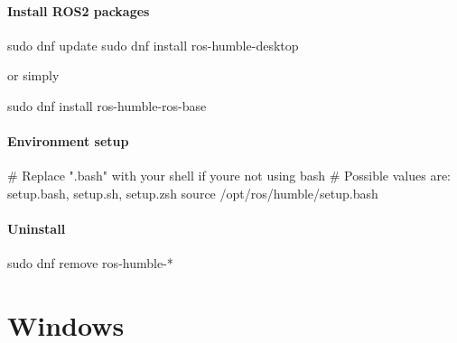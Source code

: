 \documentclass[
  letterpaper,
  DIV=11,
  numbers=noendperiod]{scrreprt}
\newenvironment{Shaded}{\begin{snugshade}}{\end{snugshade}}
\newcommand{\BuiltInTok}[1]{\textcolor[rgb]{0.00,0.23,0.31}{#1}}
\newcommand{\CommentTok}[1]{\textcolor[rgb]{0.37,0.37,0.37}{#1}}
\newcommand{\FunctionTok}[1]{\textcolor[rgb]{0.28,0.35,0.67}{#1}}
\newcommand{\NormalTok}[1]{\textcolor[rgb]{0.00,0.23,0.31}{#1}}
\newcommand{\PreprocessorTok}[1]{\textcolor[rgb]{0.68,0.00,0.00}{#1}}
\begin{document}
\hypertarget{install-ros2-packages-1}{%
\subsubsection{Install ROS2 packages}\label{install-ros2-packages-1}}

\begin{Shaded}
\begin{Highlighting}[]
\FunctionTok{sudo}\NormalTok{ dnf update}
\FunctionTok{sudo}\NormalTok{ dnf install ros{-}humble{-}desktop}
\end{Highlighting}
\end{Shaded}

or simply

\begin{Shaded}
\begin{Highlighting}[]
\FunctionTok{sudo}\NormalTok{ dnf install ros{-}humble{-}ros{-}base}
\end{Highlighting}
\end{Shaded}

\hypertarget{environment-setup-1}{%
\subsubsection{Environment setup}\label{environment-setup-1}}

\begin{Shaded}
\begin{Highlighting}[]
\CommentTok{\# Replace ".bash" with your shell if you\textquotesingle{}re not using bash}
\CommentTok{\# Possible values are: setup.bash, setup.sh, setup.zsh}
\BuiltInTok{source}\NormalTok{ /opt/ros/humble/setup.bash}
\end{Highlighting}
\end{Shaded}

\hypertarget{uninstall-1}{%
\subsubsection{Uninstall}\label{uninstall-1}}

\begin{Shaded}
\begin{Highlighting}[]
\FunctionTok{sudo}\NormalTok{ dnf remove ros{-}humble{-}}\PreprocessorTok{*}
\end{Highlighting}
\end{Shaded}


\hypertarget{windows}{%
\chapter{Windows}\label{windows}}
\end{document}
